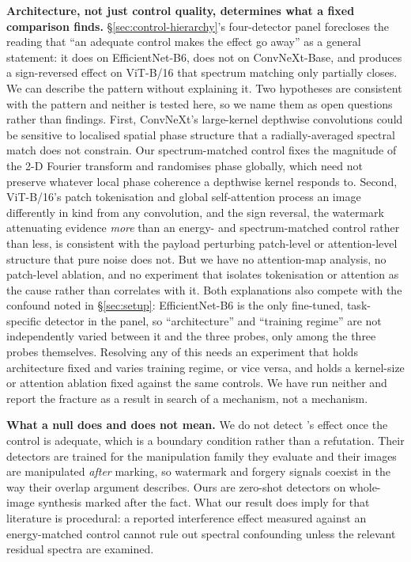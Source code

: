\documentclass[journal]{IEEEtran}
\begin{document}
\textbf{Architecture, not just control quality, determines what a fixed
comparison finds.}
\label{sec:discussion-architecture}
\S\ref{sec:control-hierarchy}'s four-detector panel forecloses the reading
that ``an adequate control makes the effect go away'' as a general statement:
it does on EfficientNet-B6, does not on ConvNeXt-Base, and produces a
sign-reversed effect on ViT-B/16 that spectrum matching only partially closes.
We can describe the pattern without explaining it. Two hypotheses are
consistent with the pattern and neither is tested here, so we name them as
open questions rather than findings. First, ConvNeXt's large-kernel
depthwise convolutions could be sensitive to localised spatial phase
structure that a radially-averaged spectral match does not constrain. Our
spectrum-matched control fixes the magnitude of the 2-D Fourier transform and
randomises phase globally, which need not preserve whatever local phase
coherence a depthwise kernel responds to. Second, ViT-B/16's patch
tokenisation and global self-attention process an image differently in kind
from any convolution, and the sign reversal, the watermark attenuating
evidence \emph{more} than an energy- and spectrum-matched control rather than
less, is consistent with the payload perturbing patch-level or
attention-level structure that pure noise does not. But we have no
attention-map analysis, no patch-level ablation, and no experiment that
isolates tokenisation or attention as the cause rather than correlates with
it. Both explanations also compete with the confound noted in
\S\ref{sec:setup}: EfficientNet-B6 is the only fine-tuned, task-specific
detector in the panel, so ``architecture'' and ``training regime'' are not
independently varied between it and the three probes, only among the three
probes themselves. Resolving any of this needs an experiment that holds
architecture fixed and varies training regime, or vice versa, and holds a
kernel-size or attention ablation fixed against the same controls. We have
run neither and report the fracture as a result in search of a mechanism, not
a mechanism.

\textbf{What a null does and does not mean.} We do not detect
\cite{wu2024watermarksbugs}'s effect once the control is adequate, which is a
boundary condition rather than a refutation. Their detectors are trained for
the manipulation family they evaluate and their images are manipulated
\emph{after} marking, so watermark and forgery signals coexist in the way
their overlap argument describes. Ours are zero-shot detectors on whole-image
synthesis marked after the fact. What our result does imply for that
literature is procedural: a reported interference effect measured against an
energy-matched control cannot rule out spectral confounding unless the
relevant residual spectra are examined.
\end{document}
